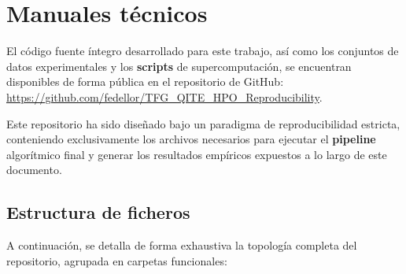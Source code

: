 \chapter{Manuales técnicos}

El código fuente íntegro desarrollado para este trabajo, así como los conjuntos de datos experimentales y los \textbf{scripts} de supercomputación, se encuentran disponibles de forma pública en el repositorio de GitHub: \url{https://github.com/fedellor/TFG_QITE_HPO_Reproducibility}.

\vspace{0.5cm}
Este repositorio ha sido diseñado bajo un paradigma de reproducibilidad estricta, conteniendo exclusivamente los archivos necesarios para ejecutar el \textbf{pipeline} algorítmico final y generar los resultados empíricos expuestos a lo largo de este documento.

\section{Estructura de ficheros}

A continuación, se detalla de forma exhaustiva la topología completa del repositorio, agrupada en carpetas funcionales:

